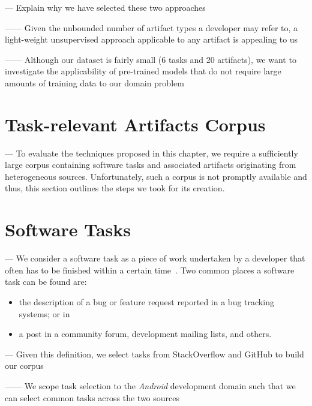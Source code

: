 \clearpage

--- Explain why we have selected these two approaches

------ Given the unbounded number of artifact types a developer may refer to, a light-weight unsupervised approach applicable to any artifact is appealing to us

------ Although our dataset is fairly small (6 tasks and 20 artifacts), we want to investigate 
the applicability of pre-trained models that do not require large amounts of training data
to our domain problem~\cite{devlin2018bert, Ye2016, Bavota2016}

\section{Task-relevant Artifacts Corpus}

--- To evaluate the techniques proposed in this chapter, we require a sufficiently large corpus containing 
software tasks and associated artifacts originating from heterogeneous sources.
Unfortunately, such a corpus is not promptly available and thus, 
this section outlines the steps we took for its creation.


\section{Software Tasks}

--- We consider a software task as a piece of work undertaken by a developer that often has to be finished within a certain time~\cite{2004merriam}. 
Two common places a software task can be found are:

\begin{itemize}
    \item the description of a bug or feature request reported in a bug tracking systems; or in
    \item a post in a community forum, development mailing lists, and others.
\end{itemize}

\vspace{3mm}

--- Given this definition, we select tasks from StackOverflow and GitHub to build our corpus

------ We scope task selection to the \textit{Android} development domain such that we can select common tasks across the two sources \vspace{3mm}



